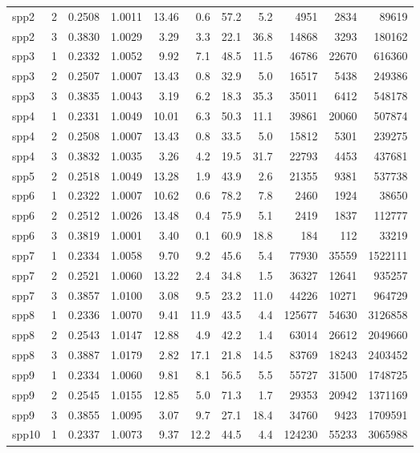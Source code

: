 \documentclass[11pt,a4paper]{article}
\theoremstyle{themethm}
\theoremstyle{themedef}
\theoremstyle{themeex}
\theoremstyle{themerem}
\begin{document}
\begin{longtable}{llrrrrrrrrr}
spp2 & 2 & 0.2508 & 1.0011 & 13.46 & 0.6 & 57.2 & 5.2 & 4951 & 2834 & 89619 \\
spp2 & 3 & 0.3830 & 1.0029 & 3.29 & 3.3 & 22.1 & 36.8 & 14868 & 3293 & 180162 \\
spp3 & 1 & 0.2332 & 1.0052 & 9.92 & 7.1 & 48.5 & 11.5 & 46786 & 22670 & 616360 \\
spp3 & 2 & 0.2507 & 1.0007 & 13.43 & 0.8 & 32.9 & 5.0 & 16517 & 5438 & 249386 \\
spp3 & 3 & 0.3835 & 1.0043 & 3.19 & 6.2 & 18.3 & 35.3 & 35011 & 6412 & 548178 \\
spp4 & 1 & 0.2331 & 1.0049 & 10.01 & 6.3 & 50.3 & 11.1 & 39861 & 20060 & 507874 \\
spp4 & 2 & 0.2508 & 1.0007 & 13.43 & 0.8 & 33.5 & 5.0 & 15812 & 5301 & 239275 \\
spp4 & 3 & 0.3832 & 1.0035 & 3.26 & 4.2 & 19.5 & 31.7 & 22793 & 4453 & 437681 \\
spp5 & 2 & 0.2518 & 1.0049 & 13.28 & 1.9 & 43.9 & 2.6 & 21355 & 9381 & 537738 \\
spp6 & 1 & 0.2322 & 1.0007 & 10.62 & 0.6 & 78.2 & 7.8 & 2460 & 1924 & 38650 \\
spp6 & 2 & 0.2512 & 1.0026 & 13.48 & 0.4 & 75.9 & 5.1 & 2419 & 1837 & 112777 \\
spp6 & 3 & 0.3819 & 1.0001 & 3.40 & 0.1 & 60.9 & 18.8 & 184 & 112 & 33219 \\
spp7 & 1 & 0.2334 & 1.0058 & 9.70 & 9.2 & 45.6 & 5.4 & 77930 & 35559 & 1522111 \\
spp7 & 2 & 0.2521 & 1.0060 & 13.22 & 2.4 & 34.8 & 1.5 & 36327 & 12641 & 935257 \\
spp7 & 3 & 0.3857 & 1.0100 & 3.08 & 9.5 & 23.2 & 11.0 & 44226 & 10271 & 964729 \\
spp8 & 1 & 0.2336 & 1.0070 & 9.41 & 11.9 & 43.5 & 4.4 & 125677 & 54630 & 3126858 \\
spp8 & 2 & 0.2543 & 1.0147 & 12.88 & 4.9 & 42.2 & 1.4 & 63014 & 26612 & 2049660 \\
spp8 & 3 & 0.3887 & 1.0179 & 2.82 & 17.1 & 21.8 & 14.5 & 83769 & 18243 & 2403452 \\
spp9 & 1 & 0.2334 & 1.0060 & 9.81 & 8.1 & 56.5 & 5.5 & 55727 & 31500 & 1748725 \\
spp9 & 2 & 0.2545 & 1.0155 & 12.85 & 5.0 & 71.3 & 1.7 & 29353 & 20942 & 1371169 \\
spp9 & 3 & 0.3855 & 1.0095 & 3.07 & 9.7 & 27.1 & 18.4 & 34760 & 9423 & 1709591 \\
spp10 & 1 & 0.2337 & 1.0073 & 9.37 & 12.2 & 44.5 & 4.4 & 124230 & 55233 & 3065988 \\

\end{longtable}
\end{document}
